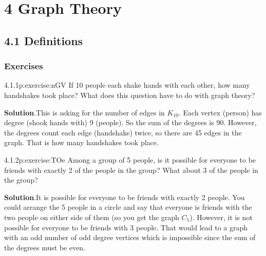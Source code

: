 \documentclass[twoside,11pt,]{book}
\newcommand{\blocktitlefont}{\relax}
\numberwithin{equation}{chapter}
\begin{document}
\chapter*{4 Graph Theory}
\section*{4.1 Definitions}
\subsection*{Exercises}
\begin{divisionsolution}{4.1.1}{}{p:exercise:nGV}%
If 10 people each shake hands with each other, how many handshakes took place? What does this question have to do with graph theory?%
\par\smallskip%
\noindent\textbf{\blocktitlefont Solution}.\quad{}This is asking for the number of edges in \(K_{10}\). Each vertex (person) has degree (shook hands with) 9 (people). So the sum of the degrees is \(90\). However, the degrees count each edge (handshake) twice, so there are 45 edges in the graph. That is how many handshakes took place.%
\end{divisionsolution}%
\begin{divisionsolution}{4.1.2}{}{p:exercise:TOe}%
Among a group of 5 people, is it possible for everyone to be friends with exactly 2 of the people in the group? What about 3 of the people in the group?%
\par\smallskip%
\noindent\textbf{\blocktitlefont Solution}.\quad{}It is possible for everyone to be friends with exactly 2 people. You could arrange the 5 people in a circle and say that everyone is friends with the two people on either side of them (so you get the graph \(C_5\)). However, it is not possible for everyone to be friends with 3 people. That would lead to a graph with an odd number of odd degree vertices which is impossible since the sum of the degrees must be even.%
\end{divisionsolution}%
\end{document}
